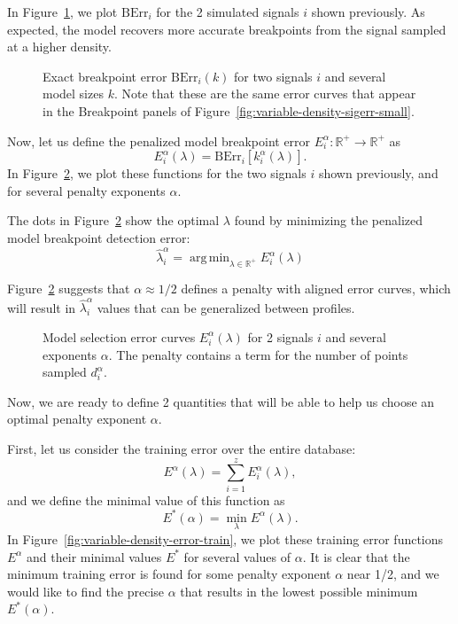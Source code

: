 \documentclass{jsfds} %
\newcommand{\fig}[3][H]{
  \begin{figure}[#1]
    \hskip -1cm
    
    \caption{#3}
    \label{fig:#2}
  \end{figure}
}
\DeclareMathOperator*{\argmin}{arg\,min}
\newcommand{\RR}{\mathbb{R}}
\begin{document}
In Figure~\ref{fig:variable-density-berr-k}, we plot $\text{BErr}_i$
for the 2 simulated signals $i$ shown previously.  As expected, the
model recovers more accurate breakpoints from the signal sampled at a
higher density.  

\fig{variable-density-berr-k}{Exact breakpoint error
  $\text{BErr}_i(k)$ for two signals $i$ and several model
  sizes $k$. Note that these are the same error curves that appear
in the Breakpoint panels of Figure~\ref{fig:variable-density-sigerr-small}.}

\newpage

Now, let us define the penalized
model breakpoint error $E^\alpha_i:\RR^+\rightarrow\RR^+$ as
\begin{equation}
  \label{eq:lerr}
E^\alpha_i(\lambda) = \text{BErr}_i\left[
k^\alpha_i(\lambda)
\right].
\end{equation}
In Figure~\ref{fig:variable-density-berr}, we plot these functions for the
two signals $i$ shown previously, and for several penalty exponents $\alpha$.

The dots in Figure~\ref{fig:variable-density-berr} show the optimal
$\lambda$ found by minimizing the penalized model breakpoint detection
error:
\begin{equation}
  \label{eq:lambda_hat}
  \hat \lambda^\alpha_i = \argmin_{\lambda\in\RR^+}  E^\alpha_i(\lambda)
\end{equation}

Figure~\ref{fig:variable-density-berr} suggests that $\alpha\approx1/2$
defines a penalty with aligned error curves, which will result in
$\hat \lambda_i^\alpha$ values that can be generalized between
profiles. 

\fig{variable-density-berr}{Model selection error curves
  $E_i^\alpha(\lambda)$ for 2 signals $i$ and several exponents
  $\alpha$. The penalty contains a term for the number of points sampled $d_i^\alpha$.}

\newpage

Now, we are ready to define 2 quantities that will be able to help us
choose an optimal penalty exponent $\alpha$.

First, let us consider the training error over the entire database:
\begin{equation}
  \label{eq:lerr_train}
  E^\alpha(\lambda) = \sum_{i=1}^z E_i^\alpha(\lambda),
\end{equation}
and we define the minimal value of this function as
\begin{equation}
  \label{eq:lerr_train_min}
  E^*(\alpha) = \min_\lambda E^\alpha(\lambda).
\end{equation}
In Figure~\ref{fig:variable-density-error-train}, we plot these
training error functions $E^\alpha$ and their minimal values $E^*$ for
several values of $\alpha$. It is clear that the minimum training
error is found for some penalty exponent $\alpha$ near 1/2, and we
would like to find the precise $\alpha$ that results in the lowest
possible minimum $E^*(\alpha)$.
\end{document}
